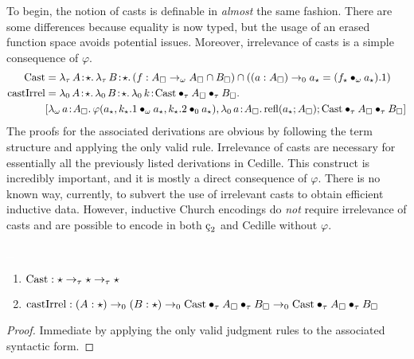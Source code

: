 To begin, the notion of casts is definable in \textit{almost} the same fashion.
There are some differences because equality is now typed, but the usage of an erased function space avoids potential issues.
Moreover, irrelevance of casts is a simple consequence of $\varphi$.
\begin{align*}
    \pCast &= \abs{\lambda_\tau}{A}{\star}{
        \abs{\lambda_\tau}{B}{\star}{
            (f : A_\square \to_\omega A_\square \cap B_\square)
            \cap ((a:A_\square) \to_0 a_\star = (\app{f_\star}{\omega}{a_\star}).1)
        }
    } \\
    \pcastIrrel &= \abs{\lambda_0}{A}{\star}{
        \abs{\lambda_0}{B}{\star}{
            \abs{\lambda_0}{k}{\apptwo{\pCast}{\tau}{A_\square}{\tau}{B_\square}}{
                \\ &[\abs{\lambda_\omega}{a}{A_\square}{
                    \varphi(a_\star, \app{k_\star.1}{\omega}{a_\star}, \app{k_\star.2}{0}{a_\star})
                }, \abs{\lambda_0}{a}{A_\square}{
                    \prefl(a_\star; A_\square)
                };
                \apptwo{\pCast}{\tau}{A_\square}{\tau}{B_\square}]
            }
        }
    }
\end{align*}
The proofs for the associated derivations are obvious by following the term structure and applying the only valid rule.
Irrelevance of casts are necessary for essentially all the previously listed derivations in Cedille.
This construct is incredibly important, and it is mostly a direct consequence of $\varphi$.
There is no known way, currently, to subvert the use of irrelevant casts to obtain efficient inductive data.
However, inductive Church encodings do \textit{not} require irrelevance of casts and are possible to encode in both $\ced$ and Cedille without $\varphi$.
\begin{theorem}
    \label{lem:2:cast_derivations}
    \textcolor{white}{\_}
    \begin{enumerate}
        \item $\textnormal{Cast} : \star \to_\tau \star \to_\tau \star$
        \item $\textnormal{castIrrel} : (A:\star) \to_0 (B:\star) \to_0 \textnormal{Cast} \bullet_{\tau} A_\square \bullet_{\tau} B_\square \to_0 \textnormal{Cast} \bullet_{\tau} A_\square \bullet_{\tau} B_\square$
    \end{enumerate}
\end{theorem}
\begin{proof}
    Immediate by applying the only valid judgment rules to the associated syntactic form.
\end{proof}
